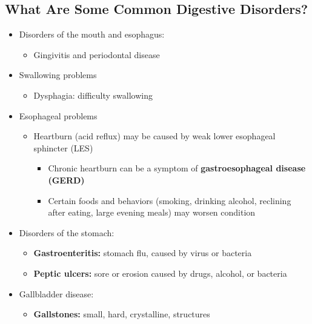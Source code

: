 \documentclass[12pt]{article}
\begin{document}
        \subsection{What Are Some Common Digestive Disorders?}
            \begin{itemize}
                \item Disorders of the mouth and esophagus:
                    \begin{itemize}
                        \item Gingivitis and periodontal disease
                    \end{itemize}
                \item Swallowing problems
                    \begin{itemize}
                        \item Dysphagia: difficulty swallowing
                    \end{itemize}
                \item Esophageal problems
                    \begin{itemize}
                        \item Heartburn (acid reflux) may be caused by weak lower esophageal sphincter (LES)
                            \begin{itemize}
                                \item Chronic heartburn can be a symptom of \textbf{gastroesophageal disease (GERD)}
                                \item Certain foods and behaviors (smoking, drinking alcohol, reclining after eating, large evening meals) may worsen condition
                            \end{itemize}
                    \end{itemize}
                \item Disorders of the stomach:
                    \begin{itemize}
                        \item \textbf{Gastroenteritis:} stomach flu, caused by virus or bacteria
                        \item \textbf{Peptic ulcers:} sore or erosion caused by drugs, alcohol, or bacteria
                    \end{itemize}
                \item Gallbladder disease:
                    \begin{itemize}
                        \item \textbf{Gallstones:} small, hard, crystalline, structures

\end{itemize}
\end{itemize}
\end{document}
